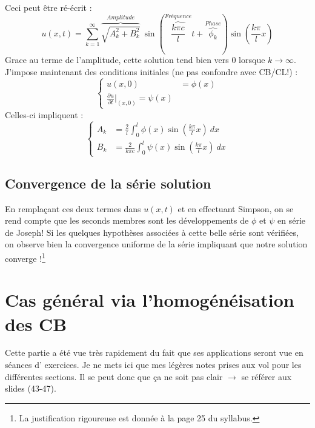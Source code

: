 \documentclass	[11pt, a4paper, openany]{book}
\newcommand{\serie}{\sum_{k=1}^\infty}
\begin{document}
	Ceci peut être ré-écrit :
	\begin{equation}
	u(x,t) = \serie \overbrace{\sqrt{A_k^2 + B_k^2}}^{Amplitude}\ \sin\left(\overbrace{
	\frac{k\pi c}{l}}^{Fréquence}t +\overbrace{\phi_k}^{Phase}\right)\sin\left(\frac{k\pi}{l}
	x\right)
	\end{equation}
	Grace au terme de l'amplitude, cette solution tend bien vers 0 lorsque $k\rightarrow\infty$.\\
	J'impose maintenant des conditions initiales (ne pas confondre avec CB/CL!) :
	\begin{equation}
	\left\{\begin{array}{ll}
	u(x,0) &= \phi(x)\\
	\frac{\partial u}{\partial t}|_{(x,0)} = \psi(x)
	\end{array}\right.
	\end{equation}
	Celles-ci impliquent :
	\begin{equation}
	\left\{\begin{array}{ll}
	A_k &= \frac{2}{l}\int_0^l \phi(x)\sin\left(\frac{k\pi}{l}x\right)\ dx\\
	B_k &= \frac{2}{k\pi c}\int_0^l \psi(x)\sin\left(\frac{k\pi}{l}x\right)\ dx
	\end{array}\right.
	\end{equation}
	
	\subsection{Convergence de la série solution}
	En remplaçant ces deux termes dans $u(x,t)$ et en effectuant Simpson, on se rend compte 
	que les seconds membres sont les développements de $\phi$ et $\psi$ en série de Joseph! 
	Si les quelques hypothèses associées à cette belle série sont vérifiées, on observe bien
	la convergence uniforme de la série impliquant que notre solution converge !\footnote{
	La justification rigoureuse est donnée à la page 25 du syllabus.}
	


\section{Cas général via l'homogénéisation des CB}
Cette partie a été vue très rapidement du fait que ses applications seront vue en séances d'
exercices. Je ne mets ici que mes légères notes prises aux vol pour les différentes sections.
Il se peut donc que ça ne soit pas clair $\rightarrow$ se référer aux slides (43-47).
\end{document}
